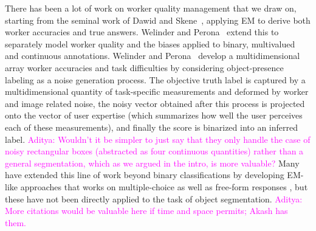 \documentclass[letterpaper]{article} %
\newcommand{\agp}[1]{\textcolor{magenta}{Aditya: #1}}
\begin{document}
\par There has been a lot of work on worker quality
management that we draw on, starting from the seminal work of Dawid and Skene~\cite{Dawid1979}, applying
EM to derive both worker accuracies and true answers. 
Welinder and Perona~\cite{OCWelinder2010} extend this to separately model
worker quality and the biases applied to binary, multivalued and continuous annotations. 
Welinder and Perona~\cite{MDWWelinder2010} develop a multidimensional array 
worker accuracies and task difficulties by considering 
object-presence labeling as a noise generation process. 
The objective truth label is captured by a multidimensional quantity of task-specific measurements and deformed by worker and image related noise, the noisy vector obtained after this process is projected onto the vector of user expertise (which summarizes how well the user perceives each of these measurements), and finally the score is binarized into an inferred label. 
\agp{Wouldn't it be simpler to just say that they only handle the case of noisy rectangular
boxes (abstracted as four continuous quantities) rather than a general segmentation, which
as we argued in the intro, is more valuable?}
Many have extended this line of work beyond binary classifications by developing EM-like approaches that works on multiple-choice \cite{Karger2013} as well as free-form responses \cite{Lin2012}, but these have not been directly applied to the task of object segmentation.
\agp{More citations would be valuable here if time and space permits; Akash has them.}
\end{document}
